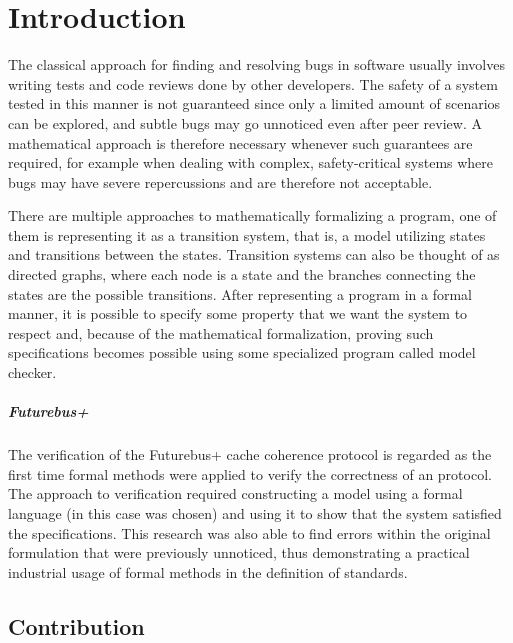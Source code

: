 \chapter{Introduction}
\label{introduction}

The classical approach for finding and resolving bugs in software usually involves writing tests and code reviews done by other developers.
The safety of a system tested in this manner is not guaranteed since only a limited amount of scenarios can be explored, and subtle bugs may go unnoticed even after peer review.
A mathematical approach is therefore necessary whenever such guarantees are required, for example when dealing with complex, safety-critical systems where bugs may have severe repercussions and are therefore not acceptable.

There are multiple approaches to mathematically formalizing a program, one of them is representing it as a transition system, that is, a model utilizing states and transitions between the states.
Transition systems can also be thought of as directed graphs, where each node is a state and the branches connecting the states are the possible transitions.
After representing a program in a formal manner, it is possible to specify some property that we want the system to respect and, because of the mathematical formalization, proving such specifications becomes possible using some specialized program called model checker.

\paragraph*{Futurebus+}
The verification of the \ieee{} Futurebus+ cache coherence protocol \cite{DBLP:journals/fmsd/ClarkeGHJLMN95} is regarded as the first time formal methods were applied to verify the correctness of an \ieee{} protocol.
The approach to verification required constructing a model using a formal language (in this case \smv{} was chosen) and using it to show that the system satisfied the specifications.
This research was also able to find errors within the original formulation that were previously unnoticed, thus demonstrating a practical industrial usage of formal methods in the definition of standards.

\section{Contribution}

